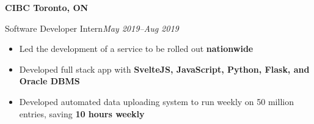 \textbf{CIBC \hfill Toronto, ON}\par

Software Developer Intern\hfill \textit{May 2019--Aug 2019}
\begin{itemize}
    \item Led the development of a service to be rolled out \textbf{nationwide}
    \item Developed full stack app with \textbf{SvelteJS, JavaScript, Python, Flask, and Oracle DBMS}
    \item Developed automated data uploading system to run weekly on 50 million entries, saving \textbf{10 hours weekly}
\end{itemize}

